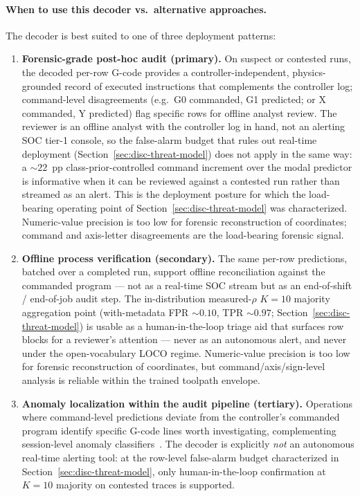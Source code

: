 \documentclass[sensors,article,submit,moreauthors,pdftex]{Definitions/mdpi}
\begin{document}
\paragraph{When to use this decoder vs.\ alternative approaches.}\label{sec:disc-when-to-use}\hspace*{0pt plus 1fill}

The decoder is best suited to one of three deployment patterns:

\begin{enumerate}
\item \textbf{Forensic-grade post-hoc audit (primary).} On suspect or contested runs, the decoded per-row G-code provides a controller-independent, physics-grounded record of executed instructions that complements the controller log; command-level disagreements (e.g.\ G0 commanded, G1 predicted; or X commanded, Y predicted) flag specific rows for offline analyst review. The reviewer is an offline analyst with the controller log in hand, not an alerting SOC tier-1 console, so the false-alarm budget that rules out real-time deployment (Section~\ref{sec:disc-threat-model}) does not apply in the same way: a $\sim$$22$~pp class-prior-controlled command increment over the modal predictor is informative when it can be reviewed against a contested run rather than streamed as an alert. This is the deployment posture for which the load-bearing operating point of Section~\ref{sec:disc-threat-model} was characterized. Numeric-value precision is too low for forensic reconstruction of coordinates; command and axis-letter disagreements are the load-bearing forensic signal.
\item \textbf{Offline process verification (secondary).} The same per-row predictions, batched over a completed run, support offline reconciliation against the commanded program --- not as a real-time SOC stream but as an end-of-shift / end-of-job audit step. The in-distribution measured-$\rho$ $K\!=\!10$ majority aggregation point (with-metadata FPR $\sim 0.10$, TPR $\sim 0.97$; Section~\ref{sec:disc-threat-model}) is usable as a human-in-the-loop triage aid that surfaces row blocks for a reviewer's attention --- never as an autonomous alert, and never under the open-vocabulary LOCO regime. Numeric-value precision is too low for forensic reconstruction of coordinates, but command/axis/sign-level analysis is reliable within the trained toolpath envelope.
\item \textbf{Anomaly localization within the audit pipeline (tertiary).} Operations where command-level predictions deviate from the controller's commanded program identify specific G-code lines worth investigating, complementing session-level anomaly classifiers~\cite{coelho2024anomaly,kimmell2025cnc}. The decoder is explicitly \emph{not} an autonomous real-time alerting tool: at the row-level false-alarm budget characterized in Section~\ref{sec:disc-threat-model}, only human-in-the-loop confirmation at $K\!=\!10$ majority on contested traces is supported.
\end{enumerate}
\end{document}
